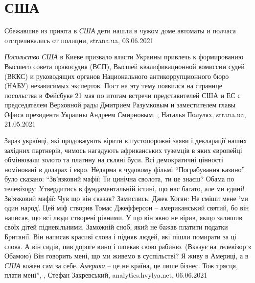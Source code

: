  
 
 
 
 
\chapter{США}
\label{sec:slova.usa}

Сбежавшие из приюта в \emph{США} дети нашли в чужом доме автоматы и полчаса отстреливались от полиции,
strana.ua, 03.06.2021

\emph{Посольство США} в Киеве призвало власти Украины привлечь к формированию
Высшего совета правосудия (ВСП), Высшей квалификационной комиссии судей (ВККС)
и руководящих органов Национального антикоррупционного бюро (НАБУ) независимых
экспертов.  Пост на эту тему появился на странице посольства в Фейсбуке 21 мая
по итогам встречи представителей США и ЕС с председателем Верховной рады
Дмитрием Разумковым и заместителем главы Офиса президента Украины Андреем
Смирновым,
, Наталья Полулях, strana.ua, 21.05.2021

Зараз українці, які продовжують вірити в пустопорожні заяви і декларації наших
західних партнерів, чимось нагадують африканських туземців в яких європейці
обмінювали золото та платину на скляні буси. Всі демократичні цінності
номіновані в доларах і євро. Недарма в чудовому фільмі \enquote{Пограбування казино}
було сказано: \enquote{Зв'язковий мафії: Ти цинічна сволота, ти це знаєш? Обама по
телевізору: Утвердитись в фундаментальній істині, що нас багато, але ми єдині!
Зв'язковий мафії: Чув що він сказав? Замислись. Джек Коган: Не сміши мене \enquote{ми
один народ}. Цей міф створив Томас Джефферсон – американський святий, бо він
написав, що всі люди створені рівними. У що він явно не вірив, якщо залишив
своїх дітей підневільними. Заможній сноб, який не бажав платити податки
Британії. Він написав красиві слова і підняв людей, які пішли помирати за ці
слова. А він сидів, пив дороге вино і шпекав свою рабиню. (Вказує на телевізор
з Обамою) Він говорить мені, що ми живемо в суспільстві? Я живу в Америці, а в
\emph{США} кожен сам за себе. \emph{Америка} – це не країна, це лише бізнес. Тож трясця,
плати мені}, 
, Стефан Закревський, analytics.hvylya.net, 06.06.2021

